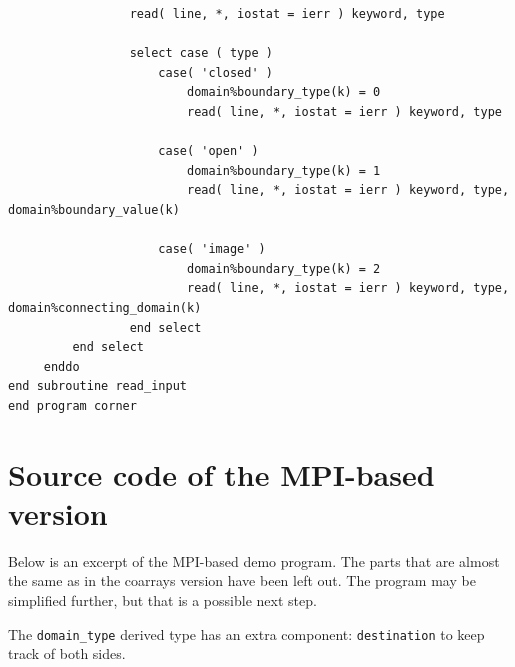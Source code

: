\documentclass[onecolumn]{article}
\begin{document}
\begin{small}
\begin{verbatim}
                 read( line, *, iostat = ierr ) keyword, type

                 select case ( type )
                     case( 'closed' )
                         domain%boundary_type(k) = 0
                         read( line, *, iostat = ierr ) keyword, type

                     case( 'open' )
                         domain%boundary_type(k) = 1
                         read( line, *, iostat = ierr ) keyword, type, domain%boundary_value(k)

                     case( 'image' )
                         domain%boundary_type(k) = 2
                         read( line, *, iostat = ierr ) keyword, type, domain%connecting_domain(k)
                 end select
         end select
     enddo
end subroutine read_input
end program corner
\end{verbatim}
\end{small}

\section{Source code of the MPI-based version}
Below is an excerpt of the MPI-based demo program. The parts that are almost the same as in the coarrays version have been left out.
The program may be simplified further, but that is a possible next step.

The \verb+domain_type+ derived type has an extra component: \verb+destination+ to keep track of both sides.
\end{document}
